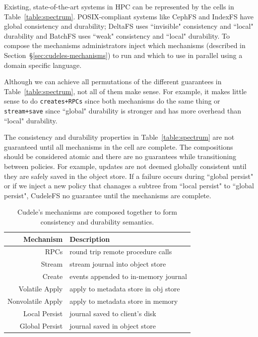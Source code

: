 Existing, state-of-the-art systems in HPC can be represented by the cells in
Table~\ref{table:spectrum}.  POSIX-compliant systems like CephFS and IndexFS
have global consistency and durability; DeltaFS uses ``invisible" consistency
and ``local" durability and BatchFS uses ``weak" consistency and ``local"
durability.  To compose the mechanisms administrators inject which mechanisms
(described in Section~\S\ref{sec:cudeles-mechanisms}) to run and which to use
in parallel using a domain specific language. 

Although we can achieve all permutations of the different guarantees in
Table~\ref{table:spectrum}, not all of them make sense. For example, it
makes little sense to do \texttt{creates+RPCs} since both mechanisms do the same
thing or \texttt{stream+save} since ``global" durability is stronger and has
more overhead than ``local" durability. 

The consistency and durability properties in Table~\ref{table:spectrum} are not
guaranteed until all mechanisms in the cell are complete. The compositions
should be considered atomic and there are no guarantees while transitioning
between policies. For example, updates are not deemed globally consistent until
they are safely saved in the object store. If a failure occurs during ``global
persist" or if we inject a new policy that chanages a subtree from ``local
persist" to ``global persist", CudeleFS no guarantee until the mechanisms are
complete.

\begin{table}
\begin{tabular}{ r | l }
  Mechanism         & Description \\\hline
  RPCs              & round trip remote procedure calls \\
  Stream            & stream journal into object store \\
  Create            & events appended to in-memory journal \\
  Volatile Apply    & apply to metadata store in obj store \\
  Nonvolatile Apply & apply to metadata store in memory \\
  Local Persist     & journal saved to client's disk \\
  Global Persist    & journal saved in object store \\
\end{tabular}
\caption{Cudele's mechanisms are composed together to form consistency and
durability semantics.\label{table:mechanisms}} 
\end{table}

